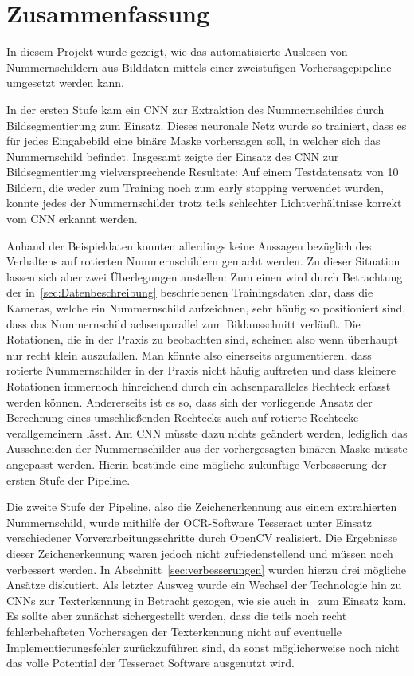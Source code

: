 \section{Zusammenfassung}
\label{sec:zusammenfassung}

In diesem Projekt wurde gezeigt, wie das automatisierte Auslesen
von Nummernschildern aus Bilddaten mittels einer zweistufigen
Vorhersagepipeline umgesetzt werden kann.

In der ersten Stufe kam ein CNN zur Extraktion des Nummernschildes durch
Bildsegmentierung zum Einsatz.
Dieses neuronale Netz wurde so trainiert, dass es f\"ur jedes
Eingabebild eine bin\"are Maske vorhersagen soll, in welcher
sich das Nummernschild befindet.
Insgesamt zeigte der Einsatz des CNN zur Bildsegmentierung vielversprechende
Resultate: Auf einem Testdatensatz von 10 Bildern, die weder zum Training
noch zum early stopping verwendet wurden, konnte jedes der Nummernschilder
trotz teils schlechter Lichtverh\"altnisse
korrekt vom CNN erkannt werden.

Anhand der Beispieldaten konnten allerdings keine Aussagen bez\"uglich
des Verhaltens auf rotierten Nummernschildern gemacht werden.
Zu dieser Situation lassen sich aber zwei \"Uberlegungen anstellen:
Zum einen wird durch Betrachtung der in~\ref{sec:Datenbeschreibung}
beschriebenen Trainingsdaten klar, dass die Kameras, welche ein Nummernschild
aufzeichnen, sehr h\"aufig so positioniert sind, dass das Nummernschild
achsenparallel zum Bildausschnitt verl\"auft. Die Rotationen, die in der
Praxis zu beobachten sind, scheinen also wenn \"uberhaupt nur recht
klein auszufallen. Man k\"onnte also einerseits argumentieren, dass
rotierte Nummernschilder in der Praxis nicht h\"aufig auftreten und dass
kleinere Rotationen immernoch hinreichend durch ein achsenparalleles
Rechteck erfasst werden k\"onnen.
Andererseits ist es so, dass sich der vorliegende Ansatz der
Berechnung eines umschlie{\ss}enden Rechtecks auch auf rotierte
Rechtecke verallgemeinern l\"asst. Am CNN m\"usste dazu nichts ge\"andert
werden, lediglich das Ausschneiden der Nummernschilder aus der
vorhergesagten bin\"aren Maske m\"usste
angepasst werden. Hierin best\"unde eine m\"ogliche zuk\"unftige
Verbesserung der ersten Stufe der Pipeline.

Die zweite Stufe der Pipeline, also die Zeichenerkennung aus einem
extrahierten Nummernschild, wurde mithilfe der OCR-Software Tesseract
unter Einsatz verschiedener Vorverarbeitungsschritte durch OpenCV realisiert.
Die Ergebnisse dieser Zeichenerkennung waren jedoch nicht
zufriedenstellend und m\"ussen noch verbessert werden.
In Abschnitt~\ref{sec:verbesserungen} wurden hierzu drei m\"ogliche
Ans\"atze diskutiert. Als letzter Ausweg wurde ein Wechsel der
Technologie hin zu CNNs zur Texterkennung in Betracht gezogen, wie sie
auch in~\cite{silva2018a} zum Einsatz kam. Es sollte
aber zun\"achst sichergestellt werden, dass die teils noch recht
fehlerbehafteten Vorhersagen der Texterkennung nicht auf eventuelle
Implementierungsfehler zur\"uckzuf\"uhren sind, da sonst
m\"oglicherweise noch nicht das volle Potential der Tesseract Software
ausgenutzt wird.

